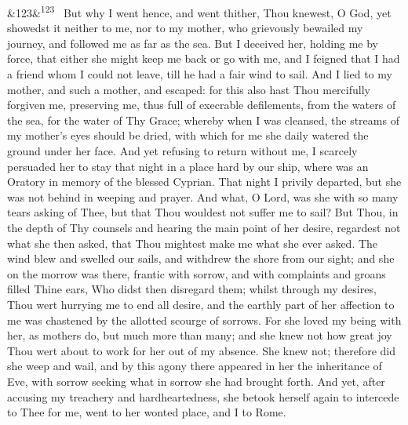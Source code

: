 \documentclass[12pt]{article}
\newcommand{\para}[1][]{\par\noindent\ifx&#1&\else\textsuperscript{\footnotesize #1}~\fi}
\begin{document}
\para[123] But why I went hence, and went thither, Thou knewest, O God, yet showedst it neither to me, nor to my mother, who grievously bewailed my journey, and followed me as far as the sea. But I deceived her, holding me by force, that either she might keep me back or go with me, and I feigned that I had a friend whom I could not leave, till he had a fair wind to sail. And I lied to my mother, and such a mother, and escaped: for this also hast Thou mercifully forgiven me, preserving me, thus full of execrable defilements, from the waters of the sea, for the water of Thy Grace; whereby when I was cleansed, the streams of my mother's eyes should be dried, with which for me she daily watered the ground under her face. And yet refusing to return without me, I scarcely persuaded her to stay that night in a place hard by our ship, where was an Oratory in memory of the blessed Cyprian. That night I privily departed, but she was not behind in weeping and prayer. And what, O Lord, was she with so many tears asking of Thee, but that Thou wouldest not suffer me to sail? But Thou, in the depth of Thy counsels and hearing the main point of her desire, regardest not what she then asked, that Thou mightest make me what she ever asked. The wind blew and swelled our sails, and withdrew the shore from our sight; and she on the morrow was there, frantic with sorrow, and with complaints and groans filled Thine ears, Who didst then disregard them; whilst through my desires, Thou wert hurrying me to end all desire, and the earthly part of her affection to me was chastened by the allotted scourge of sorrows. For she loved my being with her, as mothers do, but much more than many; and she knew not how great joy Thou wert about to work for her out of my absence. She knew not; therefore did she weep and wail, and by this agony there appeared in her the inheritance of Eve, with sorrow seeking what in sorrow she had brought forth. And yet, after accusing my treachery and hardheartedness, she betook herself again to intercede to Thee for me, went to her wonted place, and I to Rome.
\end{document}
